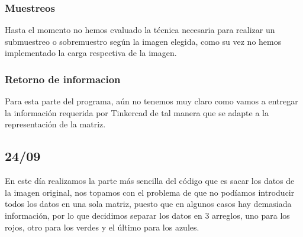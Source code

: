 \documentclass{article}
\begin{document}
    \begin{flushleft}
    \subsubsection{Muestreos}
    Hasta el momento no hemos evaluado la técnica necesaria para realizar un submuestreo o sobremuestro según la imagen elegida, como su vez no hemos implementado la carga respectiva de la imagen.  
    \end{flushleft}
    
    \begin{flushleft}
    \subsubsection{Retorno de informacion}
    Para esta parte del programa, aún no tenemos muy claro como vamos a entregar la información requerida por Tinkercad de tal manera que se adapte a la representación de la matriz.  
    \end{flushleft}
    
    \begin{flushleft}
     \subsection{24/09}
     En este día realizamos la parte más sencilla del código que es sacar los datos de la imagen original, nos topamos con el problema de que no podíamos introducir todos los datos en una sola matriz, puesto que en algunos casos hay demasiada información, por lo que decidimos separar los datos en 3 arreglos, uno para los rojos, otro para los verdes y el último para los azules.
    \end{flushleft}
    
\end{document}
